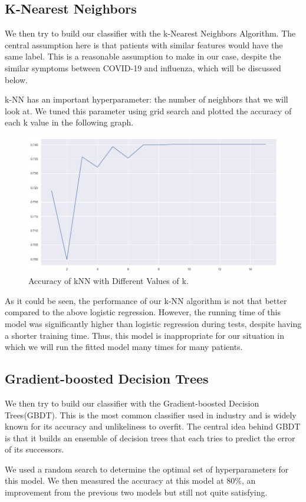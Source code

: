 \documentclass[a4paper, 11pt]{article}
\begin{document}
\subsection*{K-Nearest Neighbors}
We then try to build our classifier with the k-Nearest Neighbors Algorithm. The central assumption here is that patients with similar features would have the same label. This is a reasonable assumption to make in our case, despite the similar symptoms between COVID-19 and influenza, which will be discussed below.\par
k-NN has an important hyperparameter: the number of neighbors that we will look at. We tuned this parameter using grid search and plotted the accuracy of each k value in the following graph.
\begin{figure}[H]
\centering
\includegraphics[scale=0.4]{knn.png}
\caption{Accuracy of kNN with Different Values of k.}
\label{Confirmed Cases}
\end{figure}
As it could be seen, the performance of our k-NN algorithm is not that better compared to the above logistic regression. However, the running time of this model was significantly higher than logistic regression during tests, despite having a shorter training time. Thus, this model is inappropriate for our situation in which we will run the fitted model many times for many patients.

\subsection*{Gradient-boosted Decision Trees}
We then try to build our classifier with the Gradient-boosted Decision Trees(GBDT). This is the most common classifier used in industry and is widely known for its accuracy and unlikeliness to overfit. The central idea behind GBDT is that it builds an ensemble of decision trees that each tries to predict the error of its successors. \par
We used a random search to determine the optimal set of hyperparameters for this model. We then measured the accuracy at this model at 80\%, an improvement from the previous two models but still not quite satisfying. 
\end{document}

